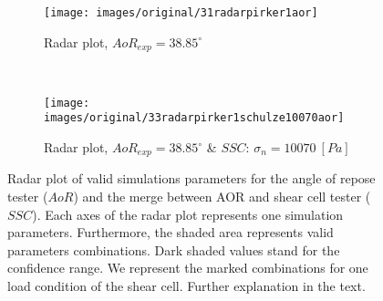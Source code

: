 \begin{figure}[htp] \centering
    \begin{subfigure}[b]{0.96\columnwidth}
        \texttt{[image: images/original/31radarpirker1aor]}
        \caption{Radar plot, $AoR_{exp} = 38.85 ^\circ$}
        \label{fig:31radarpirker1aor} 
    \end{subfigure}\\
        \begin{subfigure}[b]{0.96\columnwidth}
        \texttt{[image: images/original/33radarpirker1schulze10070aor]}
        \caption{Radar plot, $AoR_{exp} = 38.85
        ^\circ$ \& $SSC$: $\sigma_n=10070 ~[Pa]$}
        \label{fig:33radarpirker1schulze10070aor} 
    \end{subfigure}
    \caption[Radar plot of valid simulations parameters for the AOR and
    the merge between AOR and SCT valid parameters]{Radar plot of valid
    simulations parameters for the angle of repose tester ($AoR$) and the merge
    between AOR and shear cell tester ($SSC$).
    Each axes of the radar plot represents one simulation parameters.
    Furthermore, the shaded area represents valid parameters combinations.
    Dark shaded values stand for the confidence range.
    We represent the marked combinations for one load condition of the shear
    cell.
    Further explanation in the text. }
    \label{fig:35schulze10070aorradarandcloud}
\end{figure}